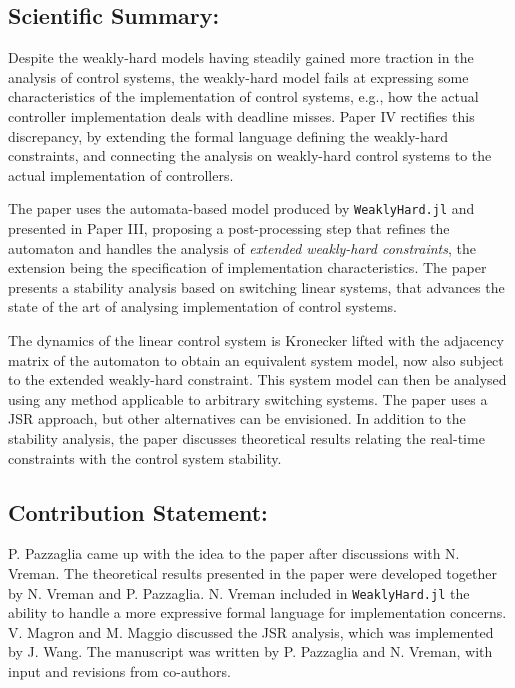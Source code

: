 \documentclass{article}
\begin{document}
\subsection*{Scientific Summary:}%
%
Despite the weakly-hard models having steadily gained more traction in the analysis of control systems, the weakly-hard model fails at expressing some characteristics of the implementation of control systems, e.g., how the actual controller implementation deals with deadline misses.
Paper IV rectifies this discrepancy, by extending the formal language defining the weakly-hard constraints, and connecting the analysis on weakly-hard control systems to the actual implementation of controllers.

The paper uses the automata-based model produced by \texttt{WeaklyHard.jl} and presented in Paper III, proposing a post-processing step that refines the automaton and handles the analysis of \emph{extended weakly-hard constraints}, the extension being the specification of implementation characteristics.
The paper presents a stability analysis based on switching linear systems, that advances the state of the art of analysing implementation of control systems.

The dynamics of the linear control system is Kronecker lifted with the adjacency matrix of the automaton to obtain an equivalent system model, now also subject to the extended weakly-hard constraint.
This system model can then be analysed using any method applicable to arbitrary switching systems.
The paper uses a JSR approach, but other alternatives can be envisioned.
In addition to the stability analysis, the paper discusses theoretical results relating the real-time constraints with the control system stability.

\subsection*{Contribution Statement:}%
%
P. Pazzaglia came up with the idea to the paper after discussions with N. Vreman.
The theoretical results presented in the paper were developed together by N. Vreman and P. Pazzaglia.
N. Vreman included in \texttt{WeaklyHard.jl} the ability to handle a more expressive formal language for implementation concerns.
V. Magron and M. Maggio discussed the JSR analysis, which was implemented by J. Wang.
The manuscript was written by P. Pazzaglia and N. Vreman, with input and revisions from co-authors.

\end{document}
